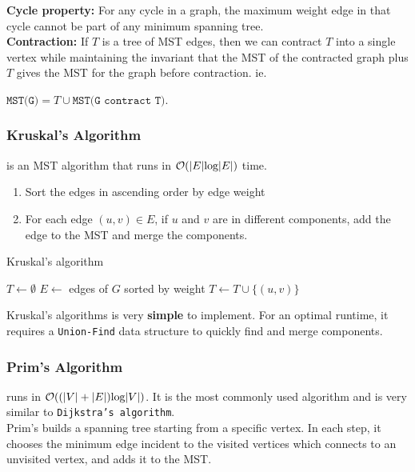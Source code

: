 \documentclass[a3paper, landscape, 11pt]{article} %
\begin{document}
\begin{multicols*}{4}
\textbf{Cycle property:} For any cycle in a graph, the maximum weight edge in that cycle cannot be part of any minimum spanning tree.\\

\textbf{Contraction:} If $T$ is a tree of MST edges, then we can contract $T$ into a single vertex while maintaining the invariant that the MST of the contracted graph plus $T$ gives the MST for the graph before contraction. ie. 

$\texttt{MST(G)} = T \cup  \texttt{MST(G contract T)}$.


\subsubsection*{Kruskal's Algorithm}
 is an MST algorithm that runs in $\mathcal{O}(|E| \text{log}|E|)$ time. 
\begin{enumerate}[noitemsep]
	\item Sort the edges in ascending order by edge weight
	\item For each edge $(u,v) \in E$, if $u$ and $v$ are in different components, add the edge to the MST and merge the components.
\end{enumerate}

\begin{algorithm}[H]
\caption{Kruskal's algorithm}
\begin{algorithmic}[1]
\State $T \gets \emptyset$ 
\State $E \gets$ edges of $G$ sorted by weight
		\State $T \gets T \cup \{(u,v)\}$
		
	\EndIf
\EndFor
\EndProcedure
\end{algorithmic}
\end{algorithm}

Kruskal's algorithms is very \textbf{simple} to implement. For an optimal runtime, it requires a \texttt{Union-Find} data structure to quickly find and merge components.

\vfill %

\subsubsection*{Prim's Algorithm}
 runs in $\mathcal{O}((|V|+|E|) \text{log}|V|)$. It is the most commonly used algorithm and is very similar to \texttt{Dijkstra's algorithm}.\\

Prim's builds a spanning tree starting from a specific vertex. In each step, it chooses the minimum edge incident to the visited vertices which connects to an unvisited vertex, and adds it to the MST.


\end{multicols*}
\end{document}

